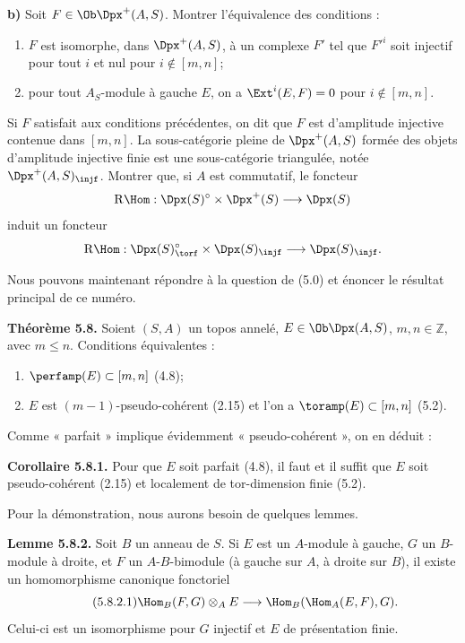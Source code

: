 \documentclass[11pt]{article}
\begin{document}
\textbf{b)} Soit \(F\in\Ob\Dpx^+(A,S)\). Montrer l'équivalence des conditions :
\begin{enumerate}[label=(\roman*)]
\item \(F\) est isomorphe, dans \(\Dpx^+(A,S)\), à un complexe \(F'\) tel que \(F'^i\) soit injectif pour tout \(i\) et nul pour \(i\notin[m,n]\);
\item pour tout \(A_S\)-module à gauche \(E\), on a \(\Ext^i(E,F)=0\) pour \(i\notin[m,n]\).
\end{enumerate}
Si \(F\) satisfait aux conditions précédentes, on dit que \(F\) est d'amplitude injective contenue dans \([m,n]\). La sous-catégorie pleine de \(\Dpx^+(A,S)\) formée des objets d'amplitude injective finie est une sous-catégorie triangulée, notée \(\Dpx^+(A,S)_{\injf}\). Montrer que, si \(A\) est commutatif, le foncteur
\[
  \mathrm R\Hom:\Dpx(S)^\circ\times\Dpx^+(S)\longrightarrow \Dpx(S)
\]
induit un foncteur
\[
  \mathrm R\Hom:\Dpx(S)^\circ_{\torf}\times\Dpx(S)_{\injf}
  \longrightarrow \Dpx(S)_{\injf}.
\]

Nous pouvons maintenant répondre à la question de (5.0) et énoncer le résultat principal de ce numéro.

\textbf{Théorème 5.8.} Soient \((S,A)\) un topos annelé, \(E\in\Ob\Dpx(A,S)\), \(m,n\in\mathbb Z\), avec \(m\leq n\). Conditions équivalentes :
\begin{enumerate}[label=(\roman*)]
\item \(\perfamp(E)\subset[m,n]\) (4.8);
\item \(E\) est \((m-1)\)-pseudo-cohérent (2.15) et l'on a \(\toramp(E)\subset[m,n]\) (5.2).
\end{enumerate}
Comme « parfait » implique évidemment « pseudo-cohérent », on en déduit :

\textbf{Corollaire 5.8.1.} Pour que \(E\) soit parfait (4.8), il faut et il suffit que \(E\) soit pseudo-cohérent (2.15) et localement de tor-dimension finie (5.2).

Pour la démonstration, nous aurons besoin de quelques lemmes.

\textbf{Lemme 5.8.2.} Soit \(B\) un anneau de \(S\). Si \(E\) est un \(A\)-module à gauche, \(G\) un \(B\)-module à droite, et \(F\) un \(A\)-\(B\)-bimodule (à gauche sur \(A\), à droite sur \(B\)), il existe un homomorphisme canonique fonctoriel
\begin{equation}\tag{5.8.2.1}
  \Hom_B(F,G)\otimes_A E
  \longrightarrow
  \Hom_B(\Hom_A(E,F),G).
\end{equation}
Celui-ci est un isomorphisme pour \(G\) injectif et \(E\) de présentation finie.
\end{document}
